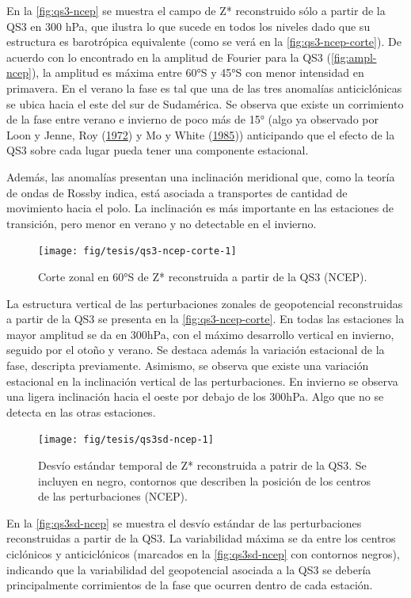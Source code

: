 \documentclass[spanish,a4paper,12pt,oneside]{book}
\begin{document}
En la \autoref{fig:qs3-ncep} se muestra el campo de Z* reconstruido sólo
a partir de la QS3 en 300 hPa, que ilustra lo que sucede en todos los
niveles dado que su estructura es barotrópica equivalente (como se verá
en la \autoref{fig:qs3-ncep-corte}). De acuerdo con lo encontrado en la
amplitud de Fourier para la QS3 (\autoref{fig:ampl-ncep}), la amplitud
es máxima entre 60°S y 45°S con menor intensidad en primavera. En el
verano la fase es tal que una de las tres anomalías anticiclónicas se
ubica hacia el este del sur de Sudamérica. Se observa que existe un
corrimiento de la fase entre verano e invierno de poco más de 15° (algo
ya observado por Loon y Jenne, Roy
(\protect\hyperlink{ref-Loon1972}{1972}) y Mo y White
(\protect\hyperlink{ref-Mo1985}{1985})) anticipando que el efecto de la
QS3 sobre cada lugar pueda tener una componente estacional.

Además, las anomalías presentan una inclinación meridional que, como la
teoría de ondas de Rossby indica, está asociada a transportes de
cantidad de movimiento hacia el polo. La inclinación es más importante
en las estaciones de transición, pero menor en verano y no detectable en
el invierno.

\begin{figure}
\texttt{[image: fig/tesis/qs3-ncep-corte-1]} \caption{Corte zonal en 60°S de Z* reconstruida a partir de la QS3 (NCEP).}\label{fig:qs3-ncep-corte}
\end{figure}

La estructura vertical de las perturbaciones zonales de geopotencial
reconstruidas a partir de la QS3 se presenta en la
\autoref{fig:qs3-ncep-corte}. En todas las estaciones la mayor amplitud
se da en 300hPa, con el máximo desarrollo vertical en invierno, seguido
por el otoño y verano. Se destaca además la variación estacional de la
fase, descripta previamente. Asimismo, se observa que existe una
variación estacional en la inclinación vertical de las perturbaciones.
En invierno se observa una ligera inclinación hacia el oeste por debajo
de los 300hPa. Algo que no se detecta en las otras estaciones.

\begin{figure}
\texttt{[image: fig/tesis/qs3sd-ncep-1]} \caption{Desvío estándar temporal de Z* reconstruida a patrir de la QS3. Se incluyen en negro, contornos que describen la posición de los centros de las perturbaciones (NCEP).}\label{fig:qs3sd-ncep}
\end{figure}

En la \autoref{fig:qs3sd-ncep} se muestra el desvío estándar de las
perturbaciones reconstruidas a partir de la QS3. La variabilidad máxima
se da entre los centros ciclónicos y anticiclónicos (marcados en la
\autoref{fig:qs3sd-ncep} con contornos negros), indicando que la
variabilidad del geopotencial asociada a la QS3 se debería
principalmente corrimientos de la fase que ocurren dentro de cada
estación.
\end{document}
